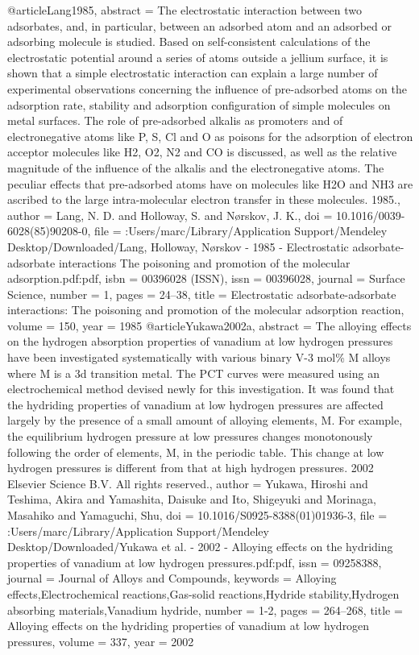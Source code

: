 @article{Lang1985,
abstract = {The electrostatic interaction between two adsorbates, and, in particular, between an adsorbed atom and an adsorbed or adsorbing molecule is studied. Based on self-consistent calculations of the electrostatic potential around a series of atoms outside a jellium surface, it is shown that a simple electrostatic interaction can explain a large number of experimental observations concerning the influence of pre-adsorbed atoms on the adsorption rate, stability and adsorption configuration of simple molecules on metal surfaces. The role of pre-adsorbed alkalis as promoters and of electronegative atoms like P, S, Cl and O as poisons for the adsorption of electron acceptor molecules like H2, O2, N2 and CO is discussed, as well as the relative magnitude of the influence of the alkalis and the electronegative atoms. The peculiar effects that pre-adsorbed atoms have on molecules like H2O and NH3 are ascribed to the large intra-molecular electron transfer in these molecules. {\textcopyright} 1985.},
author = {Lang, N. D. and Holloway, S. and N{\o}rskov, J. K.},
doi = {10.1016/0039-6028(85)90208-0},
file = {:Users/marc/Library/Application Support/Mendeley Desktop/Downloaded/Lang, Holloway, N{\o}rskov - 1985 - Electrostatic adsorbate-adsorbate interactions The poisoning and promotion of the molecular adsorption.pdf:pdf},
isbn = {00396028 (ISSN)},
issn = {00396028},
journal = {Surface Science},
number = {1},
pages = {24--38},
title = {{Electrostatic adsorbate-adsorbate interactions: The poisoning and promotion of the molecular adsorption reaction}},
volume = {150},
year = {1985}
}
@article{Yukawa2002a,
abstract = {The alloying effects on the hydrogen absorption properties of vanadium at low hydrogen pressures have been investigated systematically with various binary V-3 mol{\%} M alloys where M is a 3d transition metal. The PCT curves were measured using an electrochemical method devised newly for this investigation. It was found that the hydriding properties of vanadium at low hydrogen pressures are affected largely by the presence of a small amount of alloying elements, M. For example, the equilibrium hydrogen pressure at low pressures changes monotonously following the order of elements, M, in the periodic table. This change at low hydrogen pressures is different from that at high hydrogen pressures. {\textcopyright} 2002 Elsevier Science B.V. All rights reserved.},
author = {Yukawa, Hiroshi and Teshima, Akira and Yamashita, Daisuke and Ito, Shigeyuki and Morinaga, Masahiko and Yamaguchi, Shu},
doi = {10.1016/S0925-8388(01)01936-3},
file = {:Users/marc/Library/Application Support/Mendeley Desktop/Downloaded/Yukawa et al. - 2002 - Alloying effects on the hydriding properties of vanadium at low hydrogen pressures.pdf:pdf},
issn = {09258388},
journal = {Journal of Alloys and Compounds},
keywords = {Alloying effects,Electrochemical reactions,Gas-solid reactions,Hydride stability,Hydrogen absorbing materials,Vanadium hydride},
number = {1-2},
pages = {264--268},
title = {{Alloying effects on the hydriding properties of vanadium at low hydrogen pressures}},
volume = {337},
year = {2002}
}
